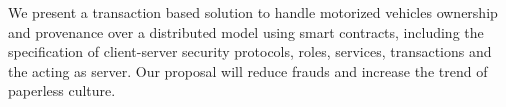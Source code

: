 
We present a transaction based solution to handle motorized vehicles ownership 
and provenance over a distributed model using smart contracts,  
including the specification of client-server security protocols,
roles, services, transactions and the \blockchaincarnetwork acting as server.
Our proposal will reduce frauds and increase the trend of paperless culture.